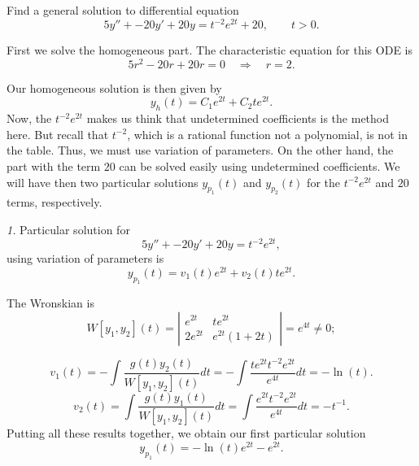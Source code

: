 \documentclass[11pt]{article}
\begin{document}
\begin{problem}
Find a general solution to differential equation
\begin{equation*}
5y'' + -20 y' +20 y = t^{-2}e^{2t}+20, \qquad t>0.
\end{equation*}
\end{problem}
\begin{solution}
First we solve the homogeneous part. The characteristic equation for this ODE is 
\begin{equation*}
5r^2 -20 r+20r =0 \quad \Rightarrow \quad r = 2.
\end{equation*}

Our homogeneous solution is then given by
\begin{equation*}
y_{h}(t) = C_{1}e^{2t}+C_{2}te^{2t}.
\end{equation*}
Now, the $t^{-2}e^{2t}$ makes us think that undetermined coefficients is the method here. But recall that $t^{-2}$, which is a rational function not a polynomial, is not in the table. Thus, we must use variation of parameters. On the other hand, the part with the term $20$ can be solved easily using undetermined coefficients. We will have then two particular solutions $y_{p_{1}}(t)$ and $y_{p_{2}}(t)$ for the $t^{-2}e^{2t}$ and $20$ terms, respectively. 

\par \textsl{1.} Particular solution for
\[5y'' + -20 y' +20 y = t^{-2}e^{2t},\] using variation of parameters is
\begin{equation*}
y_{p_{1}}(t) = v_{1}(t) e^{2t} + v_{2}(t) te^{2t}.
\end{equation*}

The Wronskian is
\begin{equation*}
W[y_{1},y_{2}](t) = \left| \begin{array}{cc} e^{2t} & te^{2t} \\
2e^{2t} & e^{2t}(1+2t) \end{array} \right| = e^{4t} \neq 0;
\end{equation*}


\begin{equation*}
v_{1}(t) = - \int \dfrac{g(t) y_{2}(t)}{W[y_{1},y_{2}](t)} dt = - \int \dfrac{te^{2t}t^{-2}e^{2t}}{e^{4t}}dt = -\ln(t).
\end{equation*}
\begin{equation*}
v_{2}(t) =  \int \dfrac{g(t) y_{1}(t)}{W[y_{1},y_{2}](t)} dt = \int \dfrac{e^{2t}t^{-2}e^{2t}}{e^{4t}}dt = -t^{-1}.
\end{equation*}
Putting all these results together, we obtain our first particular solution
\begin{equation*}
y_{p_{1}}(t) = -\ln (t)e^{2t} - e^{2t}.
\end{equation*}


\end{solution}
\end{document}
